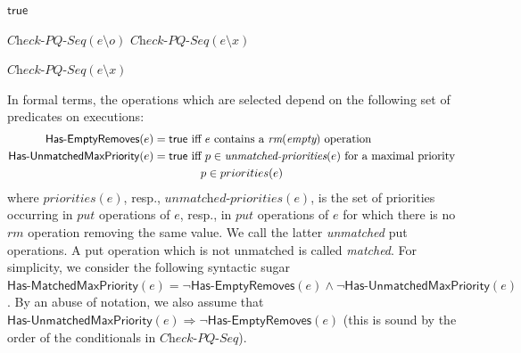 \begin{algorithm}[t]

{\Return $\mathsf{true}$\;}

{
    {
        \KwRet $\textit{Check-PQ-Seq}(e \setminus o)$\;
    }
}
{
    {
        \KwRet $\textit{Check-PQ-Seq}(e \setminus x)$\;
    }
}

\Else
{
    {
        \KwRet $\textit{Check-PQ-Seq}(e \setminus x)$\;
    }
}
\caption{$\textit{Check-PQ-Seq}$}
\label{alg:seq_check}
\end{algorithm}


In formal terms, the operations which are selected depend on the following set of predicates on executions:
{\small
\begin{align*}
\mathsf{Has\text{-}EmptyRemoves}(e)=\mathsf{true} & \mbox{ iff  $e$ contains a $\textit{rm}(\textit{empty})$ operation} \\
\mathsf{Has\text{-}UnmatchedMaxPriority}(e)=\mathsf{true} & \mbox{ iff $p\in \textit{unmatched-priorities}(e)$ for a maximal priority} \\
&\hspace{4mm}\mbox{$p\in priorities(e)$}
\end{align*}}
where $\textit{priorities}(e)$, resp., $\textit{unmatched-priorities}(e)$, is the set of priorities occurring in $\textit{put}$ operations of $e$, resp., in $\textit{put}$ operations of $e$ for which there is no $\textit{rm}$ operation removing the same value. We call the latter \emph{unmatched} put operations. A put operation which is not unmatched is called \emph{matched}. For simplicity, we consider the following syntactic sugar $\mathsf{Has\text{-}MatchedMaxPriority}(e)=\neg \mathsf{Has\text{-}EmptyRemoves}(e)\land \neg \mathsf{Has\text{-}UnmatchedMaxPriority}(e)$. By an abuse of notation, we also assume that  $\mathsf{Has\text{-}UnmatchedMaxPriority}(e) \Rightarrow \neg \mathsf{Has\text{-}EmptyRemoves}(e)$ (this is sound by the order of the conditionals in $\textit{Check-PQ-Seq}$).

